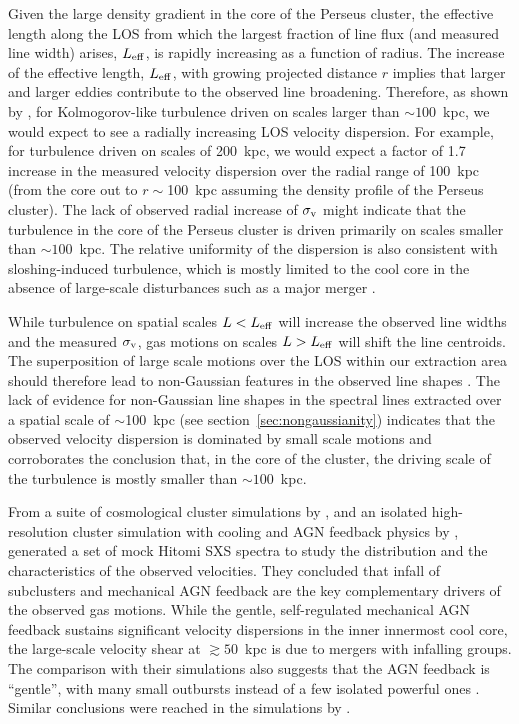 Given the large density gradient in the core of the Perseus cluster, the effective length along the LOS from which the largest fraction of line flux (and measured line width) arises, $L_{\rm eff}$, is rapidly increasing as a function of radius. The increase of the effective length, $L_{\rm eff}$,  with growing projected distance $r$ implies that larger and larger eddies contribute to the observed line broadening. Therefore, as shown by \citet{zhuravleva2012}, for Kolmogorov-like turbulence driven on scales larger than $\sim 100$~kpc, we would expect to see a radially increasing LOS velocity dispersion. For example, for turbulence driven on scales of 200~kpc, we would expect a factor of 1.7 increase in the measured velocity dispersion over the radial range of 100~kpc (from the core out to $r\sim$100~kpc assuming the density profile of the Perseus cluster). The lack of observed radial increase of $\sigma_{\rm v}$ might indicate that the turbulence in the core of the Perseus cluster is driven primarily on scales smaller than $\sim 100$~kpc. The relative uniformity of the dispersion is also consistent with sloshing-induced turbulence, which is mostly limited to the cool core in the absence of large-scale disturbances such as a major merger \citep[see figures~14--16 in][]{ZuHone13}.

While turbulence on spatial scales $L < L_{\rm eff}$ will increase the observed line widths and the measured $\sigma_{\rm v}$, gas motions on scales $L > L_{\rm eff}$ will shift the line centroids. The superposition of large scale motions over the LOS within our extraction area should therefore lead to non-Gaussian features in the observed line shapes \citep[e.g.][]{Inogamov03}. The lack of evidence for non-Gaussian line shapes in the spectral lines extracted over a spatial scale of $\sim$100~kpc (see section~\ref{sec:nongaussianity}) indicates that the observed velocity dispersion is dominated by small scale motions and corroborates the conclusion that, in the core of the cluster, the driving scale of the turbulence is mostly smaller than $\sim100$~kpc.

From a suite of cosmological cluster simulations by \citet{nelson2014}, and an isolated high-resolution cluster simulation with cooling and AGN feedback physics by \citet{gaspari2012}, \citet{lau2017} generated a set of mock Hitomi SXS spectra to study the distribution and the characteristics of the observed velocities. They concluded that infall of subclusters and mechanical AGN feedback are the key complementary drivers of the observed gas motions. While the gentle, self-regulated mechanical AGN feedback sustains significant velocity dispersions in the inner innermost cool core, the large-scale velocity shear at $\gtrsim 50$~kpc is due to mergers with infalling groups. The comparison with their simulations also suggests that the AGN feedback is ``gentle'', with many small outbursts instead of a few isolated powerful ones \citep[see also][]{Fabian06,Fabian12,mcnamara2012,mcnamara2016}.  Similar conclusions were reached in the simulations by \citet{bourne2017}.

